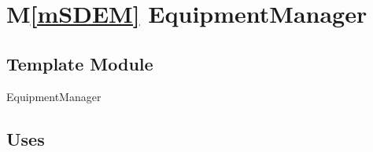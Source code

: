 \documentclass[12pt]{article}
\newcommand{\mref}[1]{M\ref{#1}}
\newcommand{\authornote}[3]{\textcolor{#1}{[#3 ---#2]}}
\newcommand{\authornote}[3]{}
\newcommand{\wss}[1]{\authornote{blue}{SS}{#1}}
\begin{document}
%
%
%
%
%

\newpage

\section* {\mref{mSDEM} EquipmentManager}

\subsection*{Template Module}

EquipmentManager

\subsection* {Uses}
\end{document}
